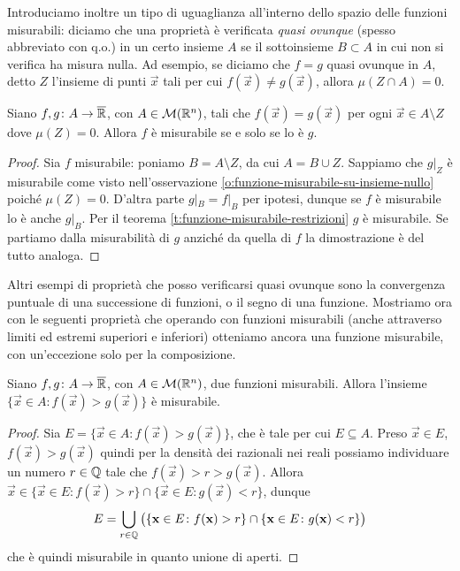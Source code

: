 Introduciamo inoltre un tipo di uguaglianza all'interno dello spazio delle funzioni misurabili: diciamo che una proprietà è verificata \emph{quasi ovunque} (spesso abbreviato con q.o.) in un certo insieme $A$ se il sottoinsieme $B\subset A$ in cui non si verifica ha misura nulla.
Ad esempio, se diciamo che $f=g$ quasi ovunque in $A$, detto $Z$ l'insieme di punti $\vec x$ tali per cui $f(\vec x)\ne g(\vec x)$, allora $\mu(Z\cap A)=0$.
\begin{teorema} \label{t:misurabile-qo}
	Siano $f,g\colon A\to\overline{\mathbb{R}}$, con $A\in\mathcal M(\mathbb{R}^n)$, tali che $f(\vec x)=g(\vec x)$ per ogni $\vec x\in A\setminus Z$ dove $\mu(Z)=0$.
	Allora $f$ è misurabile se e solo se lo è $g$.
\end{teorema}
\begin{proof}
	Sia $f$ misurabile: poniamo $B=A\setminus Z$, da cui $A=B\cup Z$.
	Sappiamo che $g|_Z$ è misurabile come visto nell'osservazione \ref{o:funzione-misurabile-su-insieme-nullo} poich\'e $\mu(Z)=0$.
	D'altra parte $g|_{B}=f|_{B}$ per ipotesi, dunque se $f$ è misurabile lo è anche $g|_B$.
	Per il teorema \ref{t:funzione-misurabile-restrizioni} $g$ è misurabile.
	Se partiamo dalla misurabilità di $g$ anzich\'e da quella di $f$ la dimostrazione è del tutto analoga.
\end{proof}
Altri esempi di proprietà che posso verificarsi quasi ovunque sono la convergenza puntuale di una successione di funzioni, o il segno di una funzione.
Mostriamo ora con le seguenti proprietà che operando con funzioni misurabili (anche attraverso limiti ed estremi superiori e inferiori) otteniamo ancora una funzione misurabile, con un'eccezione solo per la composizione.
\begin{lemma}
	Siano $f,g\colon A\to\overline{\mathbb{R}}$, con $A\in\mathcal M(\mathbb{R}^n)$, due funzioni misurabili.
	Allora l'insieme $\{\vec x\in A\colon f(\vec x)>g(\vec x)\}$ è misurabile.
\end{lemma}
\begin{proof}
	Sia $E=\{\vec x\in A\colon f(\vec x)>g(\vec x)\}$, che è tale per cui $E\subseteq A$.
	Preso $\vec x\in E$, $f(\vec x)>g(\vec x)$ quindi per la densità dei razionali nei reali possiamo individuare un numero $r\in\mathbb{Q}$ tale che $f(\vec x)>r>g(\vec x)$.
	Allora $\vec x\in\{\vec x\in E\colon f(\vec x)>r\}\cap\{\vec x\in E\colon g(\vec x)<r\}$, dunque
	\begin{equation}
		E=\bigcup_{r\in\mathbb{Q}}\big(\{\mathbf{x}\in E\colon f(\mathbf{x})>r\}\cap\{\mathbf{x}\in E\colon g(\mathbf{x})<r\}\big)
	\end{equation}
	che è quindi misurabile in quanto unione di aperti.
\end{proof}
